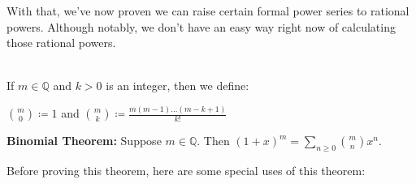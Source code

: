 \documentclass{book}
\newcommand{\hTwo}{%
\color{MidnightBlue}%
   \fontsize{13}{15}\selectfont%
}
\newenvironment{myIndent}{%
   \begin{adjustwidth}{2.5em}{0em}%
}{%
   \end{adjustwidth}%
}
\newcommand{\blab}[1]{\textbf{#1}}
\newcommand{\mySepTwo}[1][.]{%
   {\noindent\color{#1}{\rule{6.5in}{0.5mm}}}\\%
}
\newcommand{\retTwo}{\hfill\bigbreak}
\begin{document}
With that, we've now proven we can raise certain formal power series to rational powers. Although notably, we don't have an easy way right now of calculating those rational powers.\retTwo

\mySepTwo

If $m \in \mathbb{Q}$ and $k > 0$ is an integer, then we define:

{\centering $
\binom{m}{0} \coloneq 1$ and $
\binom{m}{k} \coloneq \frac{m(m-1)\ldots(m-k+1)}{k!}$\retTwo\par}

\begin{myIndent}\hTwo
   \blab{Binomial Theorem:} Suppose $m \in \mathbb{Q}$. Then $(1 + x)^m = \sum\limits_{n \geq 0}
   \binom{m}{n}x^n$.\\
\end{myIndent}

Before proving this theorem, here are some special uses of this theorem:
\end{document}
